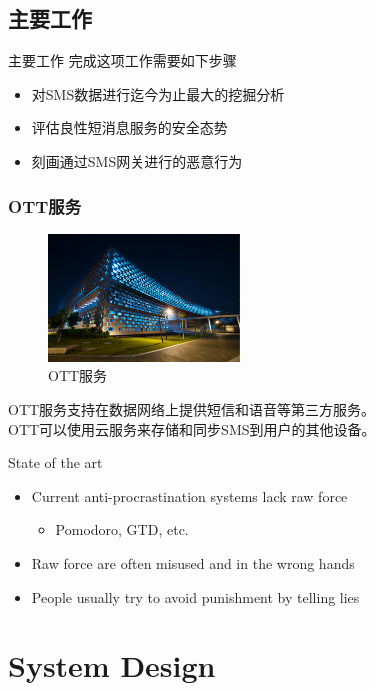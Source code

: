 \documentclass[10pt,aspectratio=43,mathserif]{beamer}
\begin{document}
\subsection{主要工作}
\begin{frame}{主要工作}
完成这项工作需要如下步骤
\begin{itemize}
\item  对SMS数据进行迄今为止最大的挖掘分析
\item 评估良性短消息服务的安全态势
\item  刻画通过SMS网关进行的恶意行为
\end{itemize}
\end{frame}

 \begin{frame}
\frametitle{OTT服务}
\begin{figure}[!t]
	\centering
	\includegraphics[width=2in]{figures/sustech.pdf}
	\caption{OTT服务}
	\label{figure3_OTT}
\end{figure}
\begin{center}
	OTT服务支持在数据网络上提供短信和语音等第三方服务。\\
	OTT可以使用云服务来存储和同步SMS到用户的其他设备。
\end{center}

\end{frame}

\begin{frame}{State of the art}
\begin{itemize}
\item Current anti-procrastination systems lack raw force
\begin{itemize}
\item Pomodoro, GTD, etc.
\end{itemize}
\item Raw force are often misused and in the wrong hands
\item People usually try to avoid punishment by telling lies
\end{itemize}
\end{frame}
\section{System Design}  %
\end{document}
